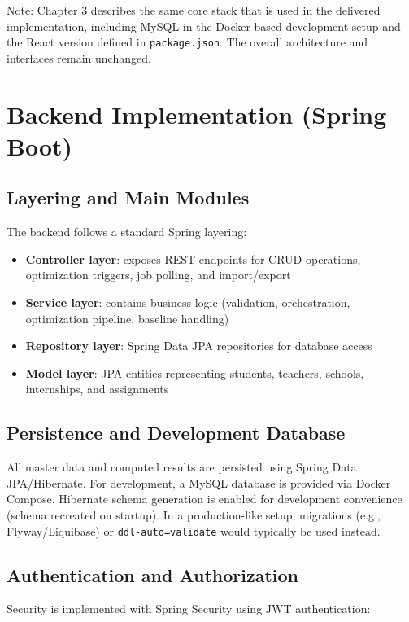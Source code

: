 \documentclass[12pt,a4paper]{report}
\begin{document}
\noindent
Note: Chapter 3 describes the same core stack that is used in the delivered implementation, including MySQL in the Docker-based development setup and the React version defined in \texttt{package.json}. The overall architecture and interfaces remain unchanged.

\section{Backend Implementation (Spring Boot)}

\subsection{Layering and Main Modules}

The backend follows a standard Spring layering:

\begin{itemize}
    \item \textbf{Controller layer}: exposes REST endpoints for CRUD operations, optimization triggers, job polling, and import/export
    \item \textbf{Service layer}: contains business logic (validation, orchestration, optimization pipeline, baseline handling)
    \item \textbf{Repository layer}: Spring Data JPA repositories for database access
    \item \textbf{Model layer}: JPA entities representing students, teachers, schools, internships, and assignments
\end{itemize}

\subsection{Persistence and Development Database}

All master data and computed results are persisted using Spring Data JPA/Hibernate. For development, a MySQL database is provided via Docker Compose. Hibernate schema generation is enabled for development convenience (schema recreated on startup). In a production-like setup, migrations (e.g., Flyway/Liquibase) or \texttt{ddl-auto=validate} would typically be used instead.

\subsection{Authentication and Authorization}

Security is implemented with Spring Security using JWT authentication:
\end{document}
